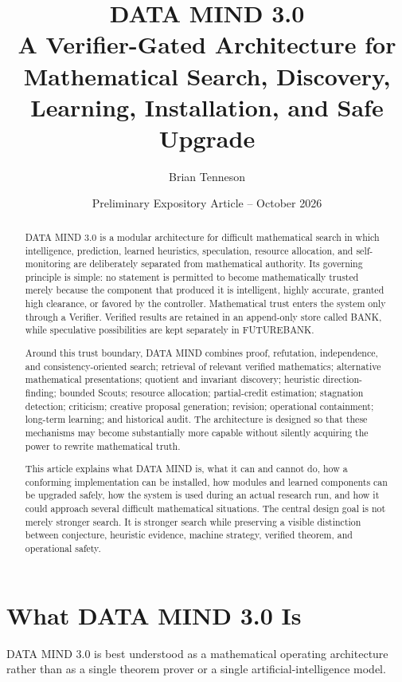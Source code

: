 \documentclass[11pt]{article}
\title{\textbf{DATA MIND 3.0}\\[0.35em]\large A Verifier-Gated Architecture for Mathematical Search, Discovery, Learning, Installation, and Safe Upgrade}
\author{Brian Tenneson}
\date{Preliminary Expository Article -- October 2026}
\begin{document}
\maketitle

\begin{abstract}
DATA MIND 3.0 is a modular architecture for difficult mathematical search in which intelligence, prediction, learned heuristics, speculation, resource allocation, and self-monitoring are deliberately separated from mathematical authority. Its governing principle is simple: no statement is permitted to become mathematically trusted merely because the component that produced it is intelligent, highly accurate, granted high clearance, or favored by the controller. Mathematical trust enters the system only through a Verifier. Verified results are retained in an append-only store called BANK, while speculative possibilities are kept separately in FUTUREBANK.\cite{freeze}

Around this trust boundary, DATA MIND combines proof, refutation, independence, and consistency-oriented search; retrieval of relevant verified mathematics; alternative mathematical presentations; quotient and invariant discovery; heuristic direction-finding; bounded Scouts; resource allocation; partial-credit estimation; stagnation detection; criticism; creative proposal generation; revision; operational containment; long-term learning; and historical audit. The architecture is designed so that these mechanisms may become substantially more capable without silently acquiring the power to rewrite mathematical truth.

This article explains what DATA MIND is, what it can and cannot do, how a conforming implementation can be installed, how modules and learned components can be upgraded safely, how the system is used during an actual research run, and how it could approach several difficult mathematical situations. The central design goal is not merely stronger search. It is stronger search while preserving a visible distinction between conjecture, heuristic evidence, machine strategy, verified theorem, and operational safety.
\end{abstract}

\section{What DATA MIND 3.0 Is}

DATA MIND 3.0 is best understood as a mathematical operating architecture rather than as a single theorem prover or a single artificial-intelligence model.
\end{document}
